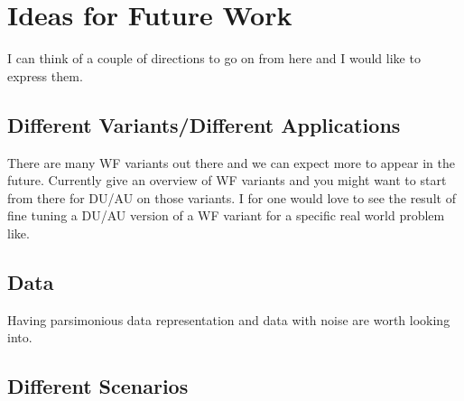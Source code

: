 



\section*{Ideas for Future Work}

I can think of a couple of directions to go on from here and I would like to express them.

\subsection*{Different Variants/Different Applications}

There are many \ac{WF} variants out there and we can expect more to appear in the future. Currently \cite{Liu2019}\cite{Jaganathan2015} 
give an overview of \ac{WF} variants and you might want to start from there for \ac{DU}/\ac{AU} on those variants. I for one would 
love to see the result of fine tuning a \ac{DU}/\ac{AU} version of a \ac{WF} variant for a specific real world problem like\cite{Fogel2013}. 

\subsection*{Data}

Having parsimonious data representation\cite{Foucart2013} and data with noise are worth looking into.

\subsection*{Different Scenarios}

